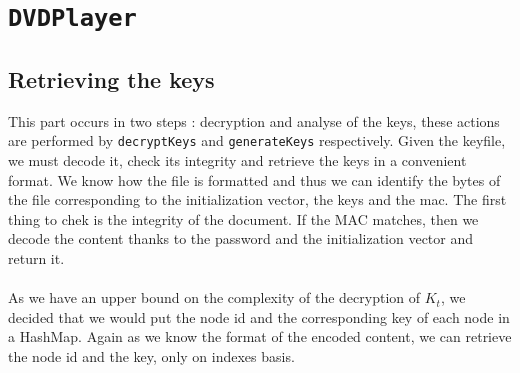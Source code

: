 \documentclass[a4paper,titlepage]{article}
\begin{document}
\section{\texttt{DVDPlayer}}
\subsection{Retrieving the keys}
This part occurs in two steps : decryption and analyse of the keys, these actions are performed by \texttt{decryptKeys} and \texttt{generateKeys} respectively.
Given the keyfile, we must decode it, check its integrity and retrieve the keys in a convenient format. We know how the file is formatted and thus we can identify the bytes of the file corresponding to the initialization vector, the keys and the mac. The first thing to chek is the integrity of the document. If the MAC matches, then we decode the content thanks to the password and the initialization vector and return it. \\ \\

As we have an upper bound on the complexity of the decryption of $K_t$, we decided that we would put the node id and the corresponding key of each node in a HashMap. Again as we know the format of the encoded content, we can retrieve the node id and the key, only on indexes basis.
\end{document}
